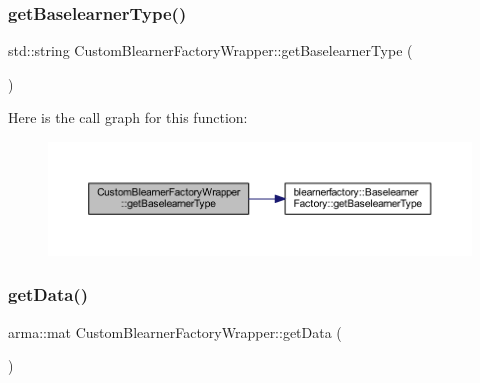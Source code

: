 \subsubsection{\texorpdfstring{get\+Baselearner\+Type()}{getBaselearnerType()}}
{\footnotesize\ttfamily std\+::string Custom\+Blearner\+Factory\+Wrapper\+::get\+Baselearner\+Type (\begin{DoxyParamCaption}{ }\end{DoxyParamCaption})\hspace{0.3cm}{\ttfamily [inline]}}

Here is the call graph for this function\+:\nopagebreak
\begin{figure}[H]
\begin{center}
\leavevmode
\includegraphics[width=350pt]{class_custom_blearner_factory_wrapper_a3131dcf7abf08a2d8cd1da1472d2a36c_cgraph}
\end{center}
\end{figure}
\mbox{\label{class_custom_blearner_factory_wrapper_a70a976e3608e37e0740df932b227de60}} 
\subsubsection{\texorpdfstring{get\+Data()}{getData()}}
{\footnotesize\ttfamily arma\+::mat Custom\+Blearner\+Factory\+Wrapper\+::get\+Data (\begin{DoxyParamCaption}{ }\end{DoxyParamCaption})\hspace{0.3cm}{\ttfamily [inline]}}


